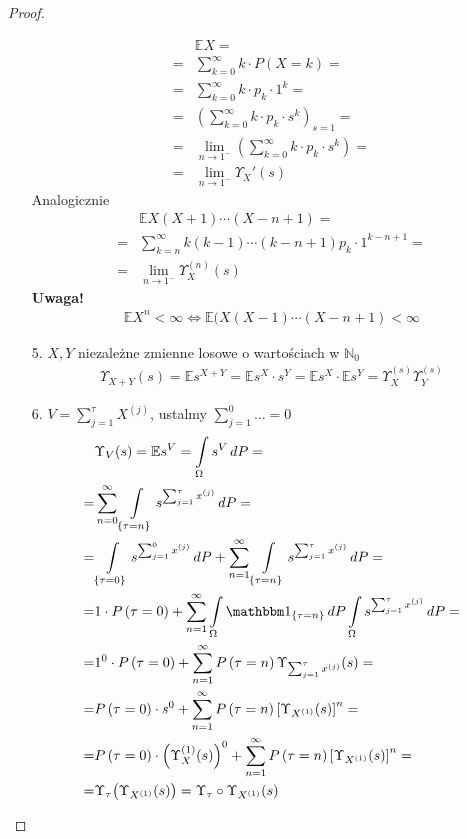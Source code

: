 \begin{proof}
\begin{itemize}
\begin{align*}
&\mathbb E X
=\\=&
\sum_{k=0}^{\infty }k\cdot P\left(X=k\right)
=\\=&
\sum_{k=0}^{\infty }k\cdot p_k\cdot 1^k
=\\=&
\left(\sum_{k=0}^{\infty }k\cdot p_k\cdot s^k\right)_{s=1}
=\\=&
\lim\limits_{n\to1^-} \left(\sum_{k=0}^{\infty }k\cdot p_k\cdot s^k\right)
=\\=&
  \lim\limits_{n\to1^-} \Upsilon_X'(s)
\end{align*}
Analogicznie
\begin{align*}
&\mathbb E X(X+1)\cdots(X-n+1)
=\\=&
\sum_{k=n}^{\infty }k(k-1)\cdots(k-n+1)p_k\cdot 1^{k-n+1}
=\\=&
\lim\limits_{n\to1^-} \Upsilon_X^{(n)}(s)
\end{align*}
\textbf{Uwaga!}\\
\begin{gather*}
\mathbb E X^n<\infty \Leftrightarrow\mathbb E (X(X-1)\cdots(X-n+1)<\infty 
\end{gather*}
\item [5.]
$ X,Y $ niezależne zmienne losowe o wartościach w $ \mathbb N _0 $
\begin{gather*}
\Upsilon_{X+Y}(s)
=
\mathbb E s^{X+Y}
=
\mathbb E s^X\cdot s^Y
=
\mathbb E s^X\cdot \mathbb E s^Y
=
\Upsilon_X^{(s)}\Upsilon_Y^{(s)}
\end{gather*}
\item [6.] $ V=\sum_{j=1}^{\tau}X^{(j)} $, ustalmy $ \sum_{j=1}^{0}\dots=0 $
\begin{align*}
&\Upsilon_V(s)=\mathbb E s^V
=
\int\limits_{\Omega}s^V\,dP
=\\=&
\sum_{n=0}^{\infty }\int\limits_{\left\{\tau=n\right\}}s^{\sum_{j=1}^{\tau}x^{(j)}}\,dP
=\\=&
\int\limits_{\left\{\tau=0\right\}}s^{\sum_{j=1}^{0}x^{(j)}}\,dP+
\sum_{n=1}^{\infty }\int\limits_{\left\{\tau=n\right\}}s^{\sum_{j=1}^{\tau}x^{(j)}}\,dP
=\\=&
1\cdot P\left(\tau=0\right)+
\sum_{n=1}^{\infty }
\int\limits_{\Omega}\mathbbm1_{\left\{\tau=n\right\}}\,dP\int\limits_{\Omega}s^{\sum_{j=1}^{\tau}x^{(j)}}\,dP
=\\=&
1^0\cdot P\left(\tau=0\right)+\sum_{n=1}^{\infty }P\left(\tau=n\right)\Upsilon_{\sum_{j=1}^{\tau}x^{(j)}}(s)
=\\=&
P\left(\tau=0\right)\cdot s^0+\sum_{n=1}^{\infty }P\left(\tau=n\right)\left[\Upsilon_{X^{(1)}}(s)\right]^n
=\\=&
P\left(\tau=0\right)\cdot \left(\Upsilon_X^{(1)}(s)\right)^0+\sum_{n=1}^{\infty }P\left(\tau=n\right)\left[\Upsilon_{X^{(1)}}(s)\right]^n
=\\=&
\Upsilon_\tau \bigl(\Upsilon_{X^{(1)}}(s)\bigr)
=
\Upsilon_\tau \circ \Upsilon_{X^{(1)}}(s)
\end{align*}
\end{itemize}
\end{proof}